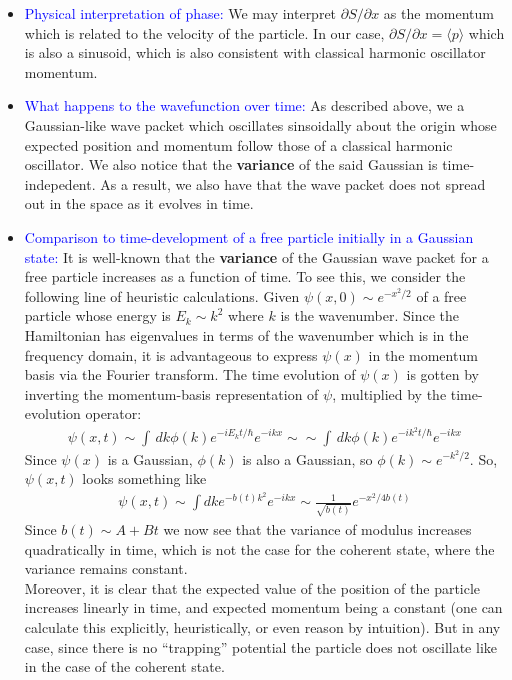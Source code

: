 \documentclass{article}
\theoremstyle{definition}
\newcommand{\p}{\partial}
\newcommand{\f}[2]{\frac{#1}{#2}}
\begin{document}
\begin{enumerate}[label=(\alph*)]
\begin{itemize}
		
		\item \textcolor{blue}{Physical interpretation of phase:} We may interpret $\p S / \p x$ as the momentum which is related to the velocity of the particle. In our case, $\p S / \p x = \langle p \rangle$ which is also a sinusoid, which is also consistent with classical harmonic oscillator momentum. 
		
		
		\item \textcolor{blue}{What happens to the wavefunction over time:} As described above, we a Gaussian-like wave packet which oscillates sinsoidally about the origin whose expected position and momentum follow those of a classical harmonic oscillator. We also notice that the \textbf{variance} of the said Gaussian is time-indepedent. As a result, we also have that the wave packet does not spread out in the space as it evolves in time. 
		
		
		\item \textcolor{blue}{Comparison to time-development of a free particle initially in a Gaussian state:}  It is well-known that the \textbf{variance} of the Gaussian wave packet for a free particle increases as a function of time. To see this, we consider the following line of heuristic calculations. Given $\psi(x,0) \sim e^{-x^2/2}$ of a free particle whose energy is $E_k \sim k^2$ where $k$ is the wavenumber. Since the Hamiltonian has eigenvalues in terms of the wavenumber which is in the frequency domain, it is advantageous to express $\psi(x)$ in the momentum basis via the Fourier transform. The time evolution of $\psi(x)$ is gotten by inverting the momentum-basis representation of $\psi$, multiplied by the time-evolution operator:
		\begin{align*}
		\psi(x,t) \sim \int \,dk \phi(k) e^{-i E_k t/\hbar} e^{-ikx} \sim \sim \int \,dk \phi(k) e^{-i k^2 t/\hbar} e^{-ikx} 
		\end{align*} 
		Since $\psi(x)$ is a Gaussian, $\phi(k)$ is also a Gaussian, so $\phi(k)\sim e^{-k^2/2}$. So, $\psi(x,t)$ looks something like 
		\begin{align*}
		\psi(x,t) \sim \int dk e^{-b(t)k^2} e^{-ikx} \sim \f{1}{\sqrt{b(t)}} e^{-x^2/4b(t)}
		\end{align*}
		Since $b(t) \sim A+ Bt$ we now see that the variance of modulus increases quadratically in time, which is not the case for the coherent state, where the variance remains constant.    \\
		
		Moreover, it is clear that the expected value of the position of the particle increases linearly in time, and expected momentum being a constant (one can calculate this explicitly, heuristically, or even reason by intuition). But in any case, since there is no ``trapping'' potential the particle does not oscillate like in the case of the coherent state. 
	\end{itemize}	
	
	
	
	
	
	
	
	
	
	
	
	
	
\end{enumerate}	
	
\end{document}
